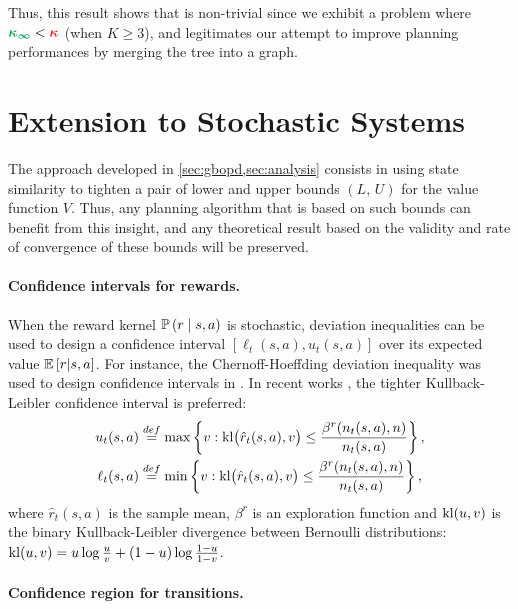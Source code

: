 \documentclass[runningheads]{llncs}
\begin{document}
Thus, this result shows that  is non-trivial since we exhibit a problem where $\hlgb{\kappa_\infty} < \hlrb{\kappa}$ (when $K\geq 3$), and legitimates our attempt to improve planning performances by merging the tree into a graph.


\section{Extension to Stochastic Systems}


The approach developed in \cref{sec:gbopd,sec:analysis} consists in using state similarity to tighten a pair of lower and upper bounds $(L,\,U)$ for the value function $V$. Thus, any planning algorithm that is based on such bounds can benefit from this insight, and any theoretical result based on the validity and rate of convergence of these bounds will be preserved.  

\paragraph{Confidence intervals for rewards.}

When the reward kernel $\mathbb{P}\left(r \;\middle|\; s,a\right)$ is stochastic, deviation inequalities can be used to design a confidence interval $[\ell_t(s,a), u_t(s,a)]$ over its expected value $\operatorname*{\mathbb{E}}\left[r | s,a\right]$. For instance, the Chernoff-Hoeffding deviation inequality was used to design confidence intervals in \citep{Kocsis06UCT,Bubeck2010open,Kaufmann2017}.
In recent works \citep{Leurent2019practical, MDPGapE2020}, the tighter Kullback-Leibler confidence interval is preferred:
\begin{align*}
u_t(s,a) &\stackrel{def}{=} \max \left\{v : \operatorname{kl}\!\big(\hat{r}_t(s,a),v\big) \leq \frac {\beta^r(n_t(s,a), n)} {n_t(s,a)} \right\},\\
\ell_t(s,a) &\stackrel{def}{=}\min \left\{v : \operatorname{kl}\!\big(\hat{r}_t(s,a),v\big) \leq \frac {\beta^r(n_t(s,a), n)} {n_t(s,a)} \right\},
\end{align*}
where $\hat{r}_t(s,a)$ is the sample mean, $\beta^r$ is an exploration function and $\operatorname{kl}(u,v)$ is the binary Kullback-Leibler divergence between Bernoulli distributions: $\operatorname{kl}(u,v) = u \log \tfrac {u} {v} + (1-u) \log \tfrac {1-u} {1-v}$.

\paragraph{Confidence region for transitions.}
\end{document}
